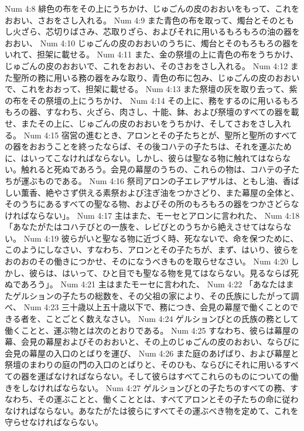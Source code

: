 Num 4:8  緋色の布をその上にうちかけ、じゅごんの皮のおおいをもって、これをおおい、さおをさし入れる。
Num 4:9  また青色の布を取って、燭台とそのともし火ざら、芯切りばさみ、芯取りざら、およびそれに用いるもろもろの油の器をおおい、
Num 4:10  じゅごんの皮のおおいのうちに、燭台とそのもろもろの器をいれて、担架に載せる。
Num 4:11  また、金の祭壇の上に青色の布をうちかけ、じゅごんの皮のおおいで、これをおおい、そのさおをさし入れる。
Num 4:12  また聖所の務に用いる務の器をみな取り、青色の布に包み、じゅごんの皮のおおいで、これをおおって、担架に載せる。
Num 4:13  また祭壇の灰を取り去って、紫の布をその祭壇の上にうちかけ、
Num 4:14  その上に、務をするのに用いるもろもろの器、すなわち、火ざら、肉さし、十能、鉢、および祭壇のすべての器を載せ、またその上に、じゅごんの皮のおおいをうちかけ、そしてさおをさし入れる。
Num 4:15  宿営の進むとき、アロンとその子たちとが、聖所と聖所のすべての器をおおうことを終ったならば、その後コハテの子たちは、それを運ぶために、はいってこなければならない。しかし、彼らは聖なる物に触れてはならない。触れると死ぬであろう。会見の幕屋のうちの、これらの物は、コハテの子たちが運ぶものである。
Num 4:16  祭司アロンの子エレアザルは、ともし油、香ばしい薫香、絶やさず供える素祭および注ぎ油をつかさどり、また幕屋の全体と、そのうちにあるすべての聖なる物、およびその所のもろもろの器をつかさどらなければならない」。
Num 4:17  主はまた、モーセとアロンに言われた、
Num 4:18  「あなたがたはコハテびとの一族を、レビびとのうちから絶えさせてはならない。
Num 4:19  彼らがいと聖なる物に近づく時、死なないで、命を保つために、このようにしなさい、すなわち、アロンとその子たちが、まず、はいり、彼らをおのおのその働きにつかせ、そのになうべきものを取らせなさい。
Num 4:20  しかし、彼らは、はいって、ひと目でも聖なる物を見てはならない。見るならば死ぬであろう」。
Num 4:21  主はまたモーセに言われた、
Num 4:22  「あなたはまたゲルションの子たちの総数を、その父祖の家により、その氏族にしたがって調べ、
Num 4:23  三十歳以上五十歳以下で、務につき、会見の幕屋で働くことのできる者を、ことごとく数えなさい。
Num 4:24  ゲルションびとの氏族の務として働くことと、運ぶ物とは次のとおりである。
Num 4:25  すなわち、彼らは幕屋の幕、会見の幕屋およびそのおおいと、その上のじゅごんの皮のおおい、ならびに会見の幕屋の入口のとばりを運び、
Num 4:26  また庭のあげばり、および幕屋と祭壇のまわりの庭の門の入口のとばりと、そのひも、ならびにそれに用いるすべての器を運ばなければならない。そして彼らはすべてこれらのものについての働きをしなければならない。
Num 4:27  ゲルションびとの子たちのすべての務、すなわち、その運ぶことと、働くこととは、すべてアロンとその子たちの命に従わなければならない。あなたがたは彼らにすべてその運ぶべき物を定めて、これを守らせなければならない。
